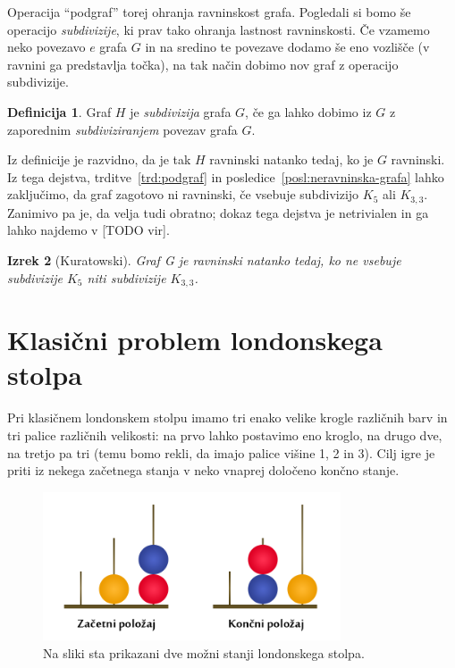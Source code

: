 \documentclass[12pt,a4paper]{amsart}
\theoremstyle{definition} %
\newtheorem{definicija}{Definicija}[section]
\theoremstyle{plain} %
\newtheorem{izrek}[definicija]{Izrek}
\newcommand{\N}{\mathbb N}
\newcommand{\graf}[1][G]{\ensuremath{#1 = (V(#1), E(#1))}}
\newcommand{\vozlisca}[1][G]{\ensuremath{V(#1)}}
\newcommand{\povezave}[1][G]{\ensuremath{E(#1)}}
\begin{document}
Operacija ``podgraf'' torej ohranja ravninskost grafa.
Pogledali si bomo še operacijo \emph{subdivizije}, ki prav tako ohranja lastnost ravninskosti. Če vzamemo neko povezavo $e$ grafa $G$ in na sredino te povezave dodamo še eno vozlišče (v ravnini ga predstavlja točka), na tak način dobimo nov graf z operacijo subdivizije. \cite[str.~66]{bib:potocnik}

\begin{definicija}
    Graf $H$ je \emph{subdivizija} grafa $G$, če ga lahko dobimo iz $G$ z zaporednim \emph{subdiviziranjem} povezav grafa $G$.\cite[str.~66]{bib:potocnik}
\end{definicija}

Iz definicije je razvidno, da je tak $H$ ravninski natanko tedaj, ko je $G$ ravninski. Iz tega dejstva, trditve~\ref{trd:podgraf} in posledice~\ref{posl:neravninska-grafa} lahko zaključimo, da graf zagotovo ni ravninski, če vsebuje subdivizijo $K_5$ ali $K_{3,3}$. Zanimivo pa je, da velja tudi obratno; dokaz tega dejstva je netrivialen in ga lahko najdemo v [TODO vir].

\begin{izrek}[Kuratowski]
    Graf G je ravninski natanko tedaj, ko ne vsebuje subdivizije $K_5$ niti subdivizije $K_{3,3}$.
\end{izrek}

\section{Klasični problem londonskega stolpa}
Pri klasičnem londonskem stolpu imamo tri enako velike krogle različnih barv in tri palice različnih velikosti: na prvo lahko postavimo eno kroglo, na drugo dve, na tretjo pa tri (temu bomo rekli, da imajo palice višine 1, 2 in 3). Cilj igre je priti iz nekega začetnega stanja v neko vnaprej določeno končno stanje.

\begin{figure}[h]
    \includegraphics[width=250pt]{img/london-tower.png}
    \caption{Na sliki sta prikazani dve možni stanji londonskega stolpa.}
    \label{fig:stanji}
\end{figure}
\end{document}
